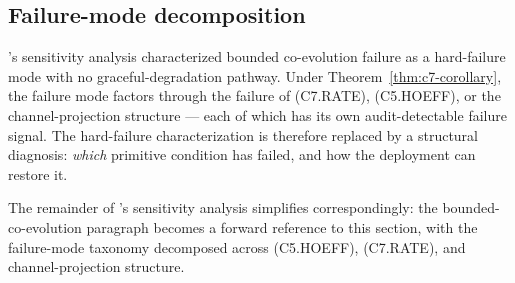 \subsection{Failure-mode decomposition}

\citep[\S 10.2]{lasser2026paper10}'s sensitivity analysis
characterized bounded co-evolution failure as a hard-failure mode
with no graceful-degradation pathway. Under
Theorem~\ref{thm:c7-corollary}, the failure mode factors through
the failure of (C7.RATE), (C5.HOEFF), or the channel-projection
structure --- each of which has its own audit-detectable failure
signal. The hard-failure characterization is therefore replaced
by a structural diagnosis: \emph{which} primitive condition has
failed, and how the deployment can restore it.

The remainder of \citep[\S 10.2]{lasser2026paper10}'s
sensitivity analysis simplifies correspondingly: the
bounded-co-evolution paragraph becomes a forward reference to
this section, with the failure-mode taxonomy decomposed across
(C5.HOEFF), (C7.RATE), and channel-projection structure.
